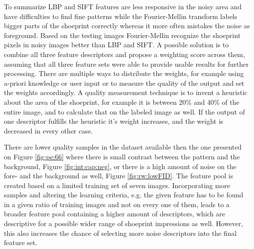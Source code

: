 \documentclass[draft,final]{vutinfth} %
\begin{document}
\par
To summarize LBP and SIFT features are less responsive in the noisy area and have difficulties to find fine patterns while the Fourier-Mellin transform labels bigger parts of the shoeprint correctly whereas it more often mistakes the noise as foreground.
Based on the testing images Fourier-Mellin recognize the shoeprint pixels in noisy images better than LBP and SIFT.
A possible solution is to combine all three feature descriptors and propose a weighting score across them, assuming that all three feature sets were able to provide usable results for further processing.
There are multiple ways to distribute the weights, for example using a-priori knowledge or user input or to measure the quality of the output and set the weights accordingly.
A quality measurement technique is to invent a heuristic about the area of the shoeprint, for example it is between 20\% and 40\% of the entire image, and to calculate that on the labeled image as well.
If the output of one descriptor fulfills the heuristic it's weight increases, and the weight is decreased in every other case.
\par
There are lower quality samples in the dataset available then the one presented on Figure  \ref{fig:pe:66} where there is small contrast between the pattern and the background, Figure  \ref{fig:int:cap:neg}, or there is a high amount of noise on the fore- and the background as well, Figure \ref{fig:rw:lowFID}.
The feature pool is created based on a limited training set of seven images.
Incorporating more samples and altering the learning criteria, e.g. the given feature has to be found in a given ratio of training images and not on every one of them, leads to a broader feature pool containing a higher amount of descriptors, which are descriptive for a possible wider range of shoeprint impressions as well.
However, this also increases the chance of selecting more noise descriptors into the final feature set.
\end{document}
